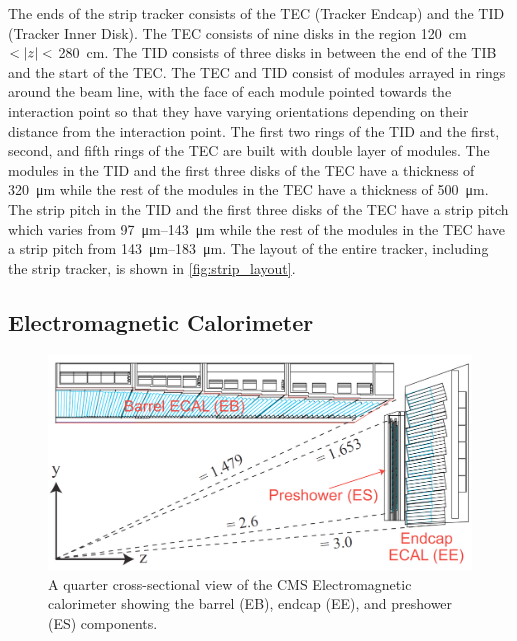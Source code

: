 The ends of the strip tracker consists of the TEC (Tracker Endcap) and the TID
(Tracker Inner Disk). The TEC consists of nine disks in the region
\SI{120}{\centi\meter} $< |z| <$ \SI{280}{\centi\meter}. The TID consists
of three disks in between the end of the TIB and the start of the TEC. The TEC
and TID consist of modules arrayed in rings around the beam line, with the face
of each module pointed towards the interaction point so that they have varying
orientations depending on their distance from the interaction point. The first
two rings of the TID and the first, second, and fifth rings of the TEC are
built with double layer of modules. The modules in the TID and the first three
disks of the TEC have a thickness of \SI{320}{\micro\meter} while the rest of
the modules in the TEC have a thickness of \SI{500}{\micro\meter}. The strip
pitch in the TID and the first three disks of the TEC have a strip pitch which
varies from \SIrange{97}{143}{\micro\meter} while the rest of the modules in
the TEC have a strip pitch from \SIrange{143}{183}{\micro\meter}. The layout of
the entire tracker, including the strip tracker, is shown in
\cref{fig:strip_layout}.

\subsection{Electromagnetic Calorimeter}
\label{ssec:ecal}

\begin{figure}[!htbp]
    \centering
    \includegraphics[width=\textwidth]{figures/ecal_layout.png}
    \caption[
        A quarter cross-sectional view of the CMS Electromagnetic calorimeter.
    ]{
        A quarter cross-sectional view of the CMS Electromagnetic calorimeter
        showing the barrel (EB), endcap (EE), and preshower (ES) components.
    }
    \label{fig:ecal_layout}
\end{figure}


